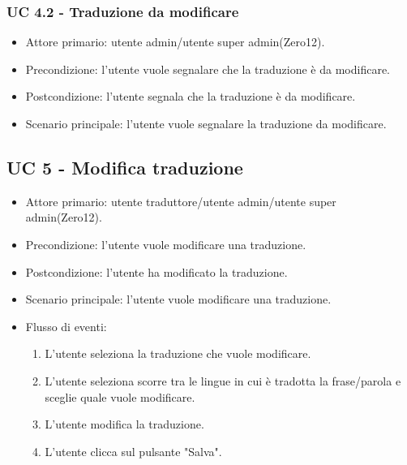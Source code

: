     \subsubsection{UC 4.2 - Traduzione da modificare}
        \begin{itemize}
            \item Attore primario: utente admin/utente super admin(Zero12).
            \item Precondizione: l'utente vuole segnalare che la traduzione è da modificare.
            \item Postcondizione: l'utente segnala che la traduzione è da modificare.
            \item Scenario principale: l'utente vuole segnalare la traduzione da modificare.
        \end{itemize}
\subsection{UC 5 - Modifica traduzione}
    \begin{itemize}
        \item Attore primario: utente traduttore/utente admin/utente super admin(Zero12).
        \item Precondizione: l'utente vuole modificare una traduzione.
        \item Postcondizione: l'utente ha modificato la traduzione.
        \item Scenario principale: l'utente vuole modificare una traduzione.
        \item Flusso di eventi:
            \begin{enumerate}
                \item L'utente seleziona la traduzione che vuole modificare.
                \item L'utente seleziona scorre tra le lingue in cui è tradotta la frase/parola e sceglie quale vuole modificare.
                \item L'utente modifica la traduzione.
                \item L'utente clicca sul pulsante "Salva".
            \end{enumerate}
    \end{itemize}
